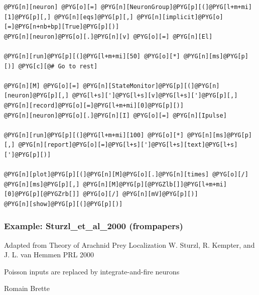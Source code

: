 \documentclass[letterpaper,10pt,english]{manual}
\begin{document}
\begin{Verbatim}[commandchars=@\[\]]
@PYG[n][neuron] @PYG[o][=] @PYG[n][NeuronGroup]@PYG[p][(]@PYG[l+m+mi][1]@PYG[p][,] @PYG[n][eqs]@PYG[p][,] @PYG[n][implicit]@PYG[o][=]@PYG[n+nb+bp][True]@PYG[p][)]
@PYG[n][neuron]@PYG[o][.]@PYG[n][v] @PYG[o][=] @PYG[n][El]

@PYG[n][run]@PYG[p][(]@PYG[l+m+mi][50] @PYG[o][*] @PYG[n][ms]@PYG[p][)] @PYG[c][@# Go to rest]

@PYG[n][M] @PYG[o][=] @PYG[n][StateMonitor]@PYG[p][(]@PYG[n][neuron]@PYG[p][,] @PYG[l+s][']@PYG[l+s][v]@PYG[l+s][']@PYG[p][,] @PYG[n][record]@PYG[o][=]@PYG[l+m+mi][0]@PYG[p][)]
@PYG[n][neuron]@PYG[o][.]@PYG[n][I] @PYG[o][=] @PYG[n][Ipulse]

@PYG[n][run]@PYG[p][(]@PYG[l+m+mi][100] @PYG[o][*] @PYG[n][ms]@PYG[p][,] @PYG[n][report]@PYG[o][=]@PYG[l+s][']@PYG[l+s][text]@PYG[l+s][']@PYG[p][)]

@PYG[n][plot]@PYG[p][(]@PYG[n][M]@PYG[o][.]@PYG[n][times] @PYG[o][/] @PYG[n][ms]@PYG[p][,] @PYG[n][M]@PYG[p][@PYGZlb[]]@PYG[l+m+mi][0]@PYG[p][@PYGZrb[]] @PYG[o][/] @PYG[n][mV]@PYG[p][)]
@PYG[n][show]@PYG[p][(]@PYG[p][)]
\end{Verbatim}

\resetcurrentobjects
\hypertarget{--doc-examples-frompapers_Sturzl_et_al_2000}{}

\hypertarget{index-33}{}\subsubsection{Example: Sturzl\_et\_al\_2000 (frompapers)}

Adapted from
Theory of Arachnid Prey Localization
W. Sturzl, R. Kempter, and J. L. van Hemmen
PRL 2000

Poisson inputs are replaced by integrate-and-fire neurons

Romain Brette
\end{document}
